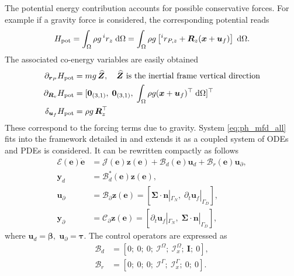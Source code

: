 \documentclass{svjour3}                     %
\begin{document}
The potential energy contribution accounts for possible conservative forces. For example if a gravity force is considered, the corresponding potential reads
\begin{equation*}
H_{\text{pot}} = \int_{\Omega} \rho g \, ^i r_z \d{\Omega} = \int_{\Omega} \rho g \left[ ^i r_{P, z} +\bm{R}_z (\bm{x} + \bm{u}_f) \right] \d{\Omega}.
\end{equation*}
The associated co-energy variables are easily obtained
\begin{align*}
\partial_{\bm{r}_P}H_{\text{pot}} &= m g \, \widehat{\bm{Z}}, \quad \text{$\widehat{\bm{Z}}$ is the inertial frame vertical direction}\\
\partial_{\bm{R}_\text{v}}H_{\text{pot}} &= [\bm{0}_{(3, 1)}, \; \bm{0}_{(3, 1)}, \; \int_{\Omega} \rho g (\bm{x} + \bm{u}_f)^\top \d{\Omega}]^\top \\
\delta_{\bm{u}_f} H_{\text{pot}} &= \rho g \, \bm{R}_z^\top
\end{align*}
These correspond to the forcing terms due to gravity.
System \eqref{eq:ph_mfd_all} fits into the framework detailed in \cite{mehrmann2019structurepreserving} and extends it as a coupled system of ODEs and PDEs is considered. It can be rewritten compactly as follows
\begin{equation}
\label{eq:MFD_pHDAE}
\begin{aligned}
\bm{\mathcal{E}}(\bm{e}) \dot{\bm{e}} &= \bm{\mathcal{J}}(\bm{e}) \bm{z}(\bm{e}) + \bm{\mathcal{B}}_d(\bm{e}) \bm{u}_d + \bm{\mathcal{B}}_r(\bm{e}) \bm{u}_\partial, \\
\bm{y}_d &= \bm{\mathcal{B}}_d^*(\bm{e}) \bm{z}(\bm{e}), \\
\bm{u}_\partial &= \bm{\mathcal{B}}_{\partial} \bm{z}(\bm{e}) =  [\bm\Sigma \cdot \bm{n}|_{\Gamma_N}, \; \partial_t \bm{u}_f|_{\Gamma_D}], \\
\bm{y}_\partial &= \bm{\mathcal{C}}_{\partial} \bm{z}(\bm{e}) = [\partial_t \bm{u}_f|_{\Gamma_N}, \; \bm\Sigma \cdot \bm{n}|_{\Gamma_D}],
\end{aligned}
\end{equation}
where $\bm{u}_d = \bm\beta, \; \bm{u}_\partial = \bm\tau$. The control operators are expressed as
\begin{align*}
	\bm{\mathcal{B}}_d &= [0; \ 0; \ 0; \ \mathcal{I}^\Omega; \ \bm{\mathcal{I}}_{x}^\Omega; \ \bm{I}; \ 0], \\
	 \bm{\mathcal{B}}_r &= [0; \ 0; \ 0; \ \mathcal{I}^\Gamma; \ \bm{\mathcal{I}}_{x}^\Gamma; \ 0; \ 0].
\end{align*}
\end{document}
